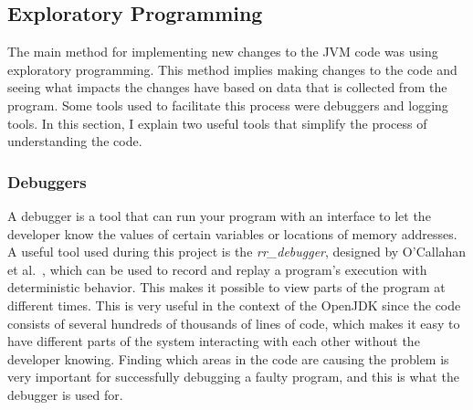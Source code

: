 

\subsection{Exploratory Programming}
The main method for implementing new changes to the JVM code was using exploratory programming. This method implies making changes to the code and seeing what impacts the changes have based on data that is collected from the program. Some tools used to facilitate this process were debuggers and logging tools. In this section, I explain two useful tools that simplify the process of understanding the code.

\subsubsection{Debuggers}
A debugger is a tool that can run your program with an interface to let the developer know the values of certain variables or locations of memory addresses. A useful tool used during this project is the \textit{rr\_debugger}, designed by O'Callahan et al.~\cite{rrdebugger}, which can be used to record and replay a program's execution with deterministic behavior. This makes it possible to view parts of the program at different times. This is very useful in the context of the OpenJDK since the code consists of several hundreds of thousands of lines of code, which makes it easy to have different parts of the system interacting with each other without the developer knowing. Finding which areas in the code are causing the problem is very important for successfully debugging a faulty program, and this is what the debugger is used for.

